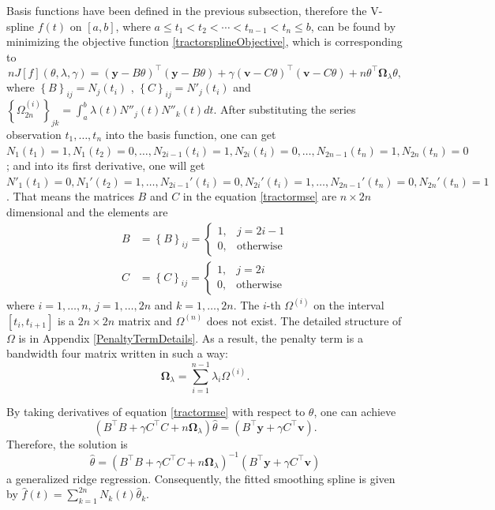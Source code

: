 Basis functions have been defined in the previous subsection, therefore the V-spline $f(t)$ on $[a,b]$, where $a \leq t_1 < t_2< \cdots < t_{n-1}<t_n \leq b$, can be found by minimizing the objective function \eqref{tractorsplineObjective}, which is corresponding to
\begin{equation}\label{tractormse}
nJ[f](\theta, \lambda,\gamma) = \left(\mathbf{y}-B \theta\right)^\top \left(\mathbf{y}-B \theta\right) +\gamma \left(\mathbf{v}- C\theta\right)^\top \left(\mathbf{v}- C\theta\right)+n \theta^\top\mathbf{\Omega}_{\lambda}\theta,
\end{equation}
where $\left\lbrace B \right\rbrace_{ij} = N_j(t_i)$ , $\left\lbrace  C\right\rbrace_{ij} = N'_j(t_i)$ and $\left\lbrace \Omega_{2n}^{(i)} \right\rbrace_{jk}=\int_{a}^{b}\lambda(t) N''_j(t)N''_k(t)dt$. After substituting the series observation $t_1, \ldots, t_n$ into the basis function, one can get $N_1(t_1)=1, N_1(t_2)=0, \ldots, N_{2i-1}(t_{i})=1, N_{2i}(t_{i})=0, \ldots, N_{2n-1}(t_n)=1, N_{2n}(t_n)=0$; and into its first derivative, one will get $N'_1(t_1)=0, N_1'(t_2)=1, \ldots, N_{2i-1}'(t_{i})=0, N_{2i}'(t_{i})=1, \ldots, N_{2n-1}'(t_n)=0, N_{2n}'(t_n)=1$. That means the matrices $B $ and $ C$ in the equation \eqref{tractormse} are $n \times 2n$ dimensional and the elements are
\begin{align}
B &=\left\lbrace B\right\rbrace_{ij}=\begin{cases}
1, & j=2i-1\\
0, & \mbox{otherwise}
\end{cases}\\
 C&=\left\lbrace C\right\rbrace_{ij}=\begin{cases}
1, & j=2i\\
0, & \mbox{otherwise}
\end{cases}
\end{align}
where $i=1, \ldots, n$, $j=1,\ldots,2n$ and $k=1,\ldots,2n$. The $i$-th $\Omega^{(i)}$ on the interval $[t_i,t_{i+1}]$ is a $2n \times 2n$ matrix and $\Omega^{(n)}$ does not exist. The detailed structure of $\Omega$ is in Appendix \ref{PenaltyTermDetails}. As a result, the penalty term is a bandwidth four matrix written in such a way:
\begin{equation}
\mathbf{\Omega}_\lambda=\sum_{i=1}^{n-1}\lambda_i\Omega^{(i)}.
\end{equation}



By taking derivatives of equation \eqref{tractormse} with respect to $\theta$, one can achieve 
\begin{equation}
\left(B^\top B +\gamma C^\top C+n\mathbf{\Omega}_{\lambda}\right)\hat{\theta}=\left(B^\top\mathbf{y}+\gamma C^\top\mathbf{v}\right).
\end{equation}
Therefore, the solution is 
\begin{equation}
\hat{\theta}=\left(B^\top B+\gamma C^\top C+n\mathbf{\Omega}_{\lambda}\right)^{-1}\left( B^\top\mathbf{y}+\gamma C^\top\mathbf{v}\right)\label{thetahat}
\end{equation}
a generalized ridge regression. Consequently, the fitted smoothing spline is given by
$\hat{f}(t)=\sum_{k=1}^{2n}N_k(t)\hat{\theta}_k$. 

